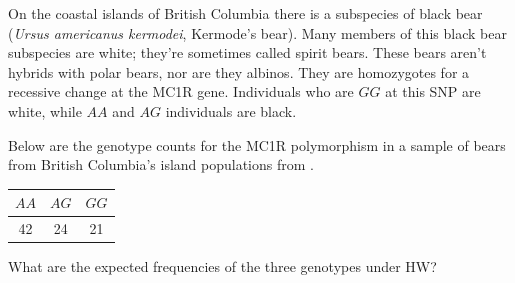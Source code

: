 \begin{question}{}
On the coastal islands of British Columbia there is a subspecies of
black bear (\textit{Ursus americanus kermodei}, Kermode's bear). Many members of this
black bear subspecies are white; they're sometimes called spirit bears. These
bears aren't hybrids with polar bears, nor are they albinos. They are
homozygotes for a recessive change at the MC1R gene. Individuals who
are $GG$ at this SNP are white, while $AA$ and $AG$ individuals are black.

Below are the genotype counts for the MC1R polymorphism in a
sample of bears from British Columbia's island populations from \citet{RITLAND:01}.
\begin{center}
\begin{tabular}{ccc}
\hline
$AA$ & $AG$ & $GG$ \\
\hline
42 & 24 & 21\\
\end{tabular}
\end{center}
What are the expected frequencies of the three genotypes under HW?
\end{question}


